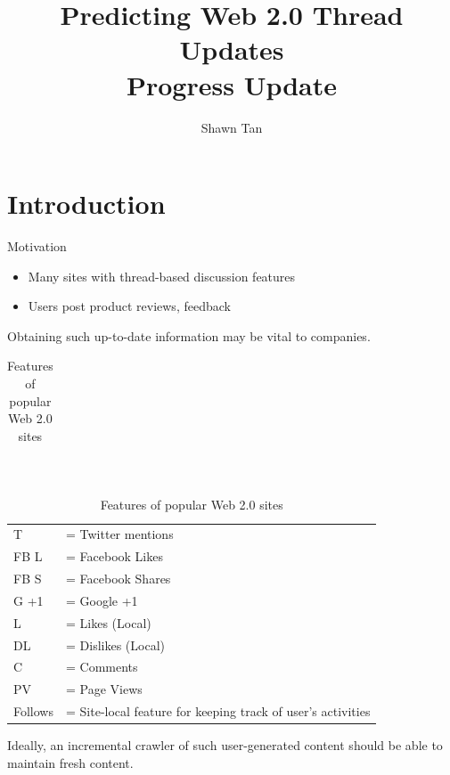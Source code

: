 \documentclass[compress]{beamer}
\title{Predicting Web 2.0 Thread Updates\\Progress Update}
\author{Shawn Tan}
\date{}
\begin{document}
\maketitle
\section{Introduction}

\begin{frame}{Motivation}
	\begin{itemize}
		\item Many sites with thread-based discussion features
		\item Users post product reviews, feedback
	\end{itemize}
	Obtaining such up-to-date information may be vital to companies.
\end{frame}

\begin{frame}
\fontsize{6pt}{7.2}\selectfont
	\begin{table}\label{table:web20}
		{
		\begin{tabular}{|l|c|c|c|c|c|c|c|c|c|c|}
			\hline
				
			\hline
		\end{tabular}
		~\\
		}
		{
	\caption{Features of popular Web 2.0 sites}
		\begin{tabular}{l l}
			   T &= Twitter mentions\\
			FB L &= Facebook Likes \\
			FB S &= Facebook Shares\\
			G +1 &= Google +1 \\
			   L &= Likes (Local) \\
			  DL &= Dislikes (Local) \\
			   C &= Comments \\
			  PV &= Page Views \\
		 Follows &= Site-local feature for keeping track of user's activities
		\end{tabular}
	}
	\end{table}
\end{frame}


\begin{frame}
Ideally, an incremental crawler of such user-generated content should be able to maintain fresh content.

\end{frame}
\end{document}

